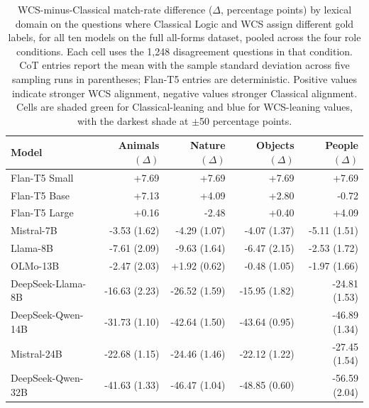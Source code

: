 \begin{table}[H]
\centering
\caption{WCS-minus-Classical match-rate difference ($\Delta$, percentage points) by lexical domain on the questions where Classical Logic and WCS assign different gold labels, for all ten models on the full all-forms dataset, pooled across the four role conditions. Each cell uses the 1,248 disagreement questions in that condition. CoT entries report the mean with the sample standard deviation across five sampling runs in parentheses; Flan-T5 entries are deterministic. Positive values indicate stronger WCS alignment, negative values stronger Classical alignment. Cells are shaded green for Classical-leaning and blue for WCS-leaning values, with the darkest shade at $\pm$50 percentage points.}
\label{tab:domain-disagreement-delta-final2}
\begin{tabular}{lrrrr}
\toprule
Model & Animals $(\Delta)$ & Nature $(\Delta)$ & Objects $(\Delta)$ & People $(\Delta)$ \\
\midrule
Flan-T5 Small & \cellcolor[HTML]{DEE1E4}+7.69 & \cellcolor[HTML]{DEE1E4}+7.69 & \cellcolor[HTML]{DEE1E4}+7.69 & \cellcolor[HTML]{DEE1E4}+7.69 \\
Flan-T5 Base & \cellcolor[HTML]{E0E2E4}+7.13 & \cellcolor[HTML]{E8E8E8}+4.09 & \cellcolor[HTML]{EBEBEA}+2.80 & \cellcolor[HTML]{F0F0EB}-0.72 \\
Flan-T5 Large & \cellcolor[HTML]{F2F1ED}+0.16 & \cellcolor[HTML]{ECEDE7}-2.48 & \cellcolor[HTML]{F1F0ED}+0.40 & \cellcolor[HTML]{E8E8E8}+4.09 \\
Mistral-7B & \cellcolor[HTML]{E9EBE5}-3.53 (1.62) & \cellcolor[HTML]{E7EAE3}-4.29 (1.07) & \cellcolor[HTML]{E8EAE4}-4.07 (1.37) & \cellcolor[HTML]{E5E8E1}-5.11 (1.51) \\
Llama-8B & \cellcolor[HTML]{DFE4DC}-7.61 (2.09) & \cellcolor[HTML]{D9E1D7}-9.63 (1.64) & \cellcolor[HTML]{E2E6DE}-6.47 (2.15) & \cellcolor[HTML]{ECEDE7}-2.53 (1.72) \\
OLMo-13B & \cellcolor[HTML]{ECEDE7}-2.47 (2.03) & \cellcolor[HTML]{EDEDEB}+1.92 (0.62) & \cellcolor[HTML]{F1F0EC}-0.48 (1.05) & \cellcolor[HTML]{EDEEE9}-1.97 (1.66) \\
DeepSeek-Llama-8B & \cellcolor[HTML]{C8D5C7}-16.63 (2.23) & \cellcolor[HTML]{AEC4B1}-26.52 (1.59) & \cellcolor[HTML]{C9D6C9}-15.95 (1.82) & \cellcolor[HTML]{B3C7B5}-24.81 (1.53) \\
DeepSeek-Qwen-14B & \cellcolor[HTML]{A1BBA5}-31.73 (1.10) & \cellcolor[HTML]{85A98C}-42.64 (1.50) & \cellcolor[HTML]{83A78A}-43.64 (0.95) & \cellcolor[HTML]{7BA283}-46.89 (1.34) \\
Mistral-24B & \cellcolor[HTML]{B8CBBA}-22.68 (1.15) & \cellcolor[HTML]{B4C8B6}-24.46 (1.46) & \cellcolor[HTML]{BACCBB}-22.12 (1.22) & \cellcolor[HTML]{ACC2AF}-27.45 (1.54) \\
DeepSeek-Qwen-32B & \cellcolor[HTML]{88AA8F}-41.63 (1.33) & \cellcolor[HTML]{7CA284}-46.47 (1.04) & \cellcolor[HTML]{769E7E}-48.85 (0.60) & \cellcolor[HTML]{739C7C}-56.59 (2.04) \\
\bottomrule
\end{tabular}
\end{table}
